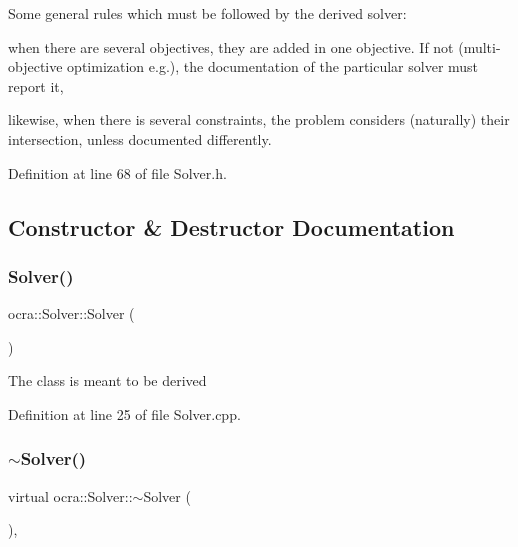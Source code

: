 Some general rules which must be followed by the derived solver\+:
\begin{DoxyItemize}
\item when there are several objectives, they are added in one objective. If not (multi-\/objective optimization e.\+g.), the documentation of the particular solver must report it,
\item likewise, when there is several constraints, the problem considers (naturally) their intersection, unless documented differently. 
\end{DoxyItemize}

Definition at line 68 of file Solver.\+h.



\subsection{Constructor \& Destructor Documentation}
\hypertarget{classocra_1_1Solver_aabd0d52a66f754de1c8f3958ba7faaca}{}\label{classocra_1_1Solver_aabd0d52a66f754de1c8f3958ba7faaca} 
\subsubsection{\texorpdfstring{Solver()}{Solver()}}
{\footnotesize\ttfamily ocra\+::\+Solver\+::\+Solver (\begin{DoxyParamCaption}{ }\end{DoxyParamCaption})\hspace{0.3cm}{\ttfamily [protected]}}

The class is meant to be derived 

Definition at line 25 of file Solver.\+cpp.

\hypertarget{classocra_1_1Solver_a9919a7070eddaaeefda307a0d4bc0aa9}{}\label{classocra_1_1Solver_a9919a7070eddaaeefda307a0d4bc0aa9} 
\subsubsection{\texorpdfstring{$\sim$\+Solver()}{~Solver()}}
{\footnotesize\ttfamily virtual ocra\+::\+Solver\+::$\sim$\+Solver (\begin{DoxyParamCaption}{ }\end{DoxyParamCaption})\hspace{0.3cm}{\ttfamily [inline]}, {\ttfamily [virtual]}}



